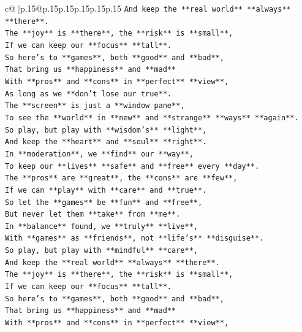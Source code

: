 \documentclass{article}
\begin{document}
{\begin{supertabular}{c@{$\;$}|p{.15\linewidth}@{}p{.15\linewidth}p{.15\linewidth}p{.15\linewidth}p{.15\linewidth}p{.15\linewidth}}
{{{\texttt{And keep the **real world** **always** **there**.} \\
\texttt{The **joy** is **there**, the **risk** is **small**,} \\
\texttt{If we can keep our **focus** **tall**.} \\
\texttt{So here's to **games**, both **good** and **bad**,} \\
\texttt{That bring us **happiness** and **mad**} \\
\texttt{With **pros** and **cons** in **perfect** **view**,} \\
\texttt{As long as we **don't lose our true**.} \\
\texttt{The **screen** is just a **window pane**,} \\
\texttt{To see the **world** in **new** and **strange** **ways** **again**.} \\
\texttt{So play, but play with **wisdom's** **light**,} \\
\texttt{And keep the **heart** and **soul** **right**.} \\
\texttt{In **moderation**, we **find** our **way**,} \\
\texttt{To keep our **lives** **safe** and **free** every **day**.} \\
\texttt{The **pros** are **great**, the **cons** are **few**,} \\
\texttt{If we can **play** with **care** and **true**.} \\
\texttt{So let the **games** be **fun** and **free**,} \\
\texttt{But never let them **take** from **me**.} \\
\texttt{In **balance** found, we **truly** **live**,} \\
\texttt{With **games** as **friends**, not **life's** **disguise**.} \\
\texttt{So play, but play with **mindful** **care**,} \\
\texttt{And keep the **real world** **always** **there**.} \\
\texttt{The **joy** is **there**, the **risk** is **small**,} \\
\texttt{If we can keep our **focus** **tall**.} \\
\texttt{So here's to **games**, both **good** and **bad**,} \\
\texttt{That bring us **happiness** and **mad**} \\
\texttt{With **pros** and **cons** in **perfect** **view**,} \\
}}}
\end{supertabular}}
\end{document}
